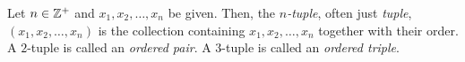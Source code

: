 \guard



\begin{defn}
\label{defn:tuple}
  Let $n\in\mathbb{Z}^+$ and $x_1,x_2,\dots, x_n$ be given.
  Then, the \emph{$n$-tuple}, often just \emph{tuple}, $(x_1,x_2,\dots,x_n)$ is the collection containing $x_1,x_2,\dots,x_n$ together with their order.
\label{defn:orderedPair}
  A $2$-tuple is called an \emph{ordered pair}.
\label{defn:orderedTriple}
  A $3$-tuple is called an \emph{ordered triple}.
\end{defn}
